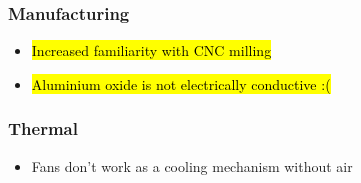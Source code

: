 \begin{comment}
\subsubsection{Mechanical }

\begin{itemize}
    \item Friendship
    \item Sleep deprivation
\end{itemize}
 \end{comment}
 
 \subsubsection{Manufacturing}
 
 \begin{itemize}
 	\item \hl{Increased familiarity with CNC milling}
 	\item \hl{Aluminium oxide is not electrically conductive :(}
 \end{itemize}

\subsubsection{Thermal }
\begin{itemize}
    \item Fans don't work as a cooling mechanism without air
\end{itemize}
